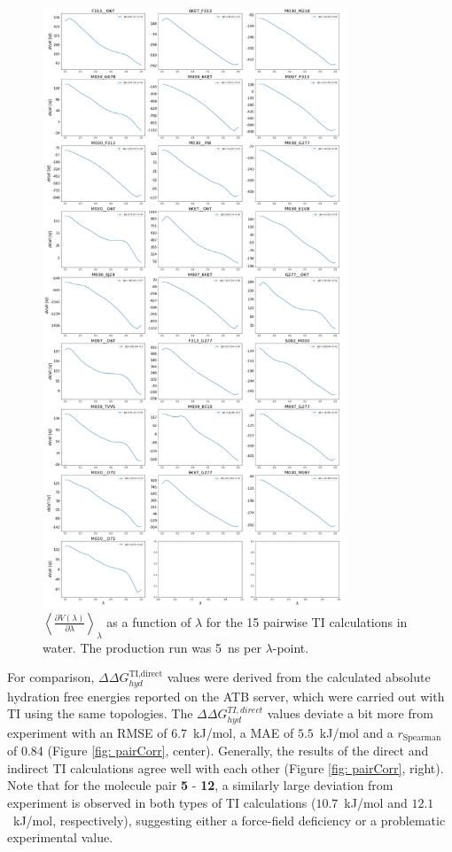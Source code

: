 \begin{figure}[H]
    \centering
    \includegraphics[width=0.8\textwidth]{fig/SI/dG_convergence/TI_water_lambda_curves.png}
    \caption{$\left< \frac{\partial V(\lambda)}{\partial \lambda} \right>_{\lambda}$ as a function of $\lambda$ for the 15 pairwise TI calculations in water. The production run was 5~ns per $\lambda$-point.}
    \label{SIfig:TI_water_curve}
\end{figure}

\FloatBarrier
For comparison, $\Delta \Delta G_{hyd}^\text{TI,direct}$ values were derived from the calculated absolute hydration free energies reported on the ATB server,\cite{Stroet2018} which were carried out with TI using the same topologies. The $\Delta \Delta G_{hyd}^{TI,direct}$ values deviate a bit more from experiment with an RMSE of $6.7$~kJ/mol, a MAE of $5.5$~kJ/mol and a $r_{\text{Spearman}}$ of 0.84 (Figure \ref{fig: pairCorr}, center).
Generally, the results of the direct\cite{Stroet2018} and indirect TI calculations agree well with each other (Figure \ref{fig: pairCorr}, right). Note that for the molecule pair \textbf{5} - \textbf{12}, a similarly large deviation from experiment is observed in both types of TI calculations ($10.7$~kJ/mol and $12.1$~kJ/mol, respectively), suggesting either a force-field deficiency or a problematic experimental value.

